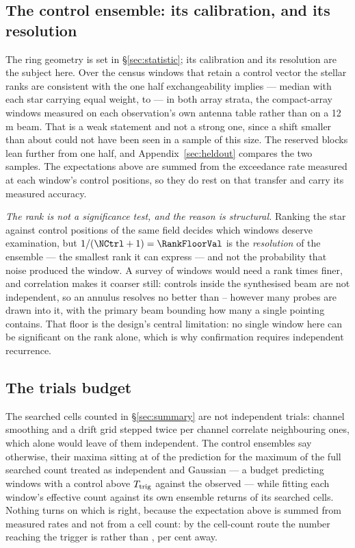 \subsection{The control ensemble: its calibration, and its resolution}

The ring geometry is set in \S\ref{sec:statistic}; its calibration and its
resolution are the subject here. Over the \VerNTested{} census windows that
retain a control vector the stellar ranks are consistent with the one half
exchangeability implies --- median \BkRankBalSurv{} with each star carrying
equal weight, \BkRankBalSurvLo{} to \BkRankBalSurvHi{} --- in both array
strata, the compact-array windows measured on each observation's own antenna
table rather than on a 12\,m beam. That is a weak statement and not a strong
one, since a shift smaller than about \VerKsPowerAca{} could not have been
seen in a sample of this size. The reserved blocks lean further from one
half, and Appendix~\ref{sec:heldout} compares the two samples. The
expectations above are summed from the exceedance rate measured at each
window's control positions, so they do rest on that transfer and carry its
measured accuracy.

\emph{The rank is not a significance test, and the reason is structural.}
Ranking the star against \NCtrl{} control positions of the same field
decides which windows deserve examination, but $1/(\NCtrl+1)=\RankFloorVal$
is the \emph{resolution} of the ensemble --- the smallest rank it can
express --- and not the probability that noise produced the window. A survey
of \NWindows{} windows would need a rank \BonfRankRatio{} times finer, and
correlation makes it coarser still: controls inside the synthesised beam are
not independent, so an annulus resolves no better than
\RankEffLo--\RankEffHi{} however many probes are drawn into it, with the
primary beam bounding how many a single pointing contains. That floor is the
design's central limitation: no single window here can be significant on the
rank alone, which is why confirmation requires independent recurrence.

\subsection{The trials budget}

The searched cells counted in \S\ref{sec:summary} are not independent
trials: channel smoothing and a drift grid stepped twice per channel
correlate neighbouring ones, which alone would leave \StGridFrac{} of them
independent. The control ensembles say otherwise, their maxima sitting at
\CtrlMaxRatioMed{} of the prediction for the maximum of the full searched
count treated as independent and Gaussian --- a budget predicting
\NCtrlWinExp{} windows with a control above $T_{\rm trig}$ against the
\NCtrlWinObs{} observed --- while fitting each window's effective count
against its own ensemble returns \StNindFrac{} of its searched cells. Nothing
turns on which is right, because the expectation above is summed from measured
rates and not from a cell count: by the cell-count route the number reaching
the trigger is \StExpModel{} rather than \CeExpTrig, \StModelAgreePct{} per
cent away.

